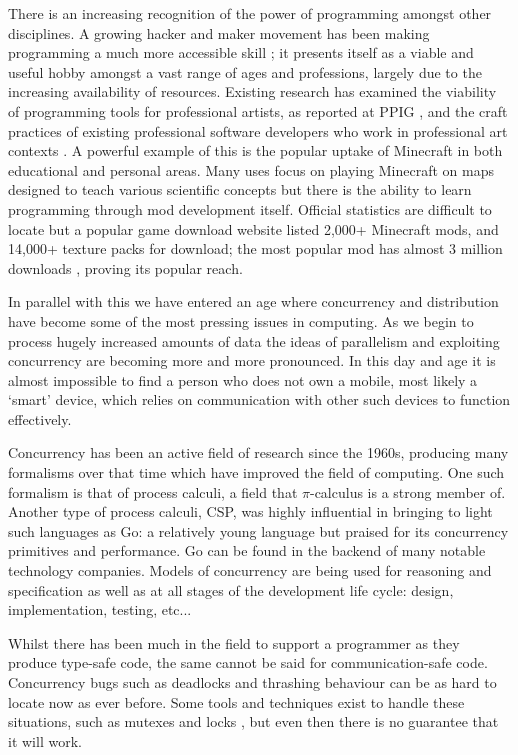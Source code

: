 \documentclass[11pt, abstracton, twoside, titlepage=true]{scrartcl}
\begin{document}
There is an increasing recognition of the power of programming amongst other 
disciplines. A growing hacker and maker movement has been making programming a 
much more accessible skill \cite{BAD14}; it presents itself as a viable and 
useful hobby amongst a vast range of ages and professions, largely due to the 
increasing availability of resources. Existing research has examined the 
viability of programming tools for professional artists, as reported at PPIG 
\cite{Ch12,BC05}, and the craft practices of existing professional software
developers who work in professional art contexts \cite{W10}. A powerful example 
of this is the popular uptake of Minecraft in both educational and personal areas. 
Many uses focus on playing Minecraft on maps designed to teach various scientific 
concepts \cite{mine1,mine2} but there is the ability to learn programming through 
mod development itself. Official statistics are difficult to locate but a popular 
game download website listed 2,000+ Minecraft mods, and 14,000+ texture packs for 
download; the most popular mod has almost 3 million downloads \cite{crush}, proving 
its popular reach. 

In parallel with this we have entered an age where concurrency and 
distribution have become some of the most pressing issues in computing. As we 
begin to process hugely increased amounts of data the ideas of parallelism and 
exploiting concurrency are becoming more and more pronounced. In this day and age
it is almost impossible to find a person who does not own a mobile, most likely a 
`smart' device, which relies on communication with other such devices to function 
effectively. 

Concurrency has been an active field of research since the 1960s, producing
many formalisms over that time which have improved the field of computing. One 
such formalism is that of process calculi, a field that $\pi$-calculus is a strong
member of. Another type of process calculi, CSP, was highly influential in 
bringing to light such languages as Go: a relatively young language but praised
for its concurrency primitives and performance. Go can be found in the backend
of many notable technology companies. Models of concurrency are being used for
reasoning and specification as well as at all stages of the development life
cycle: design, implementation, testing, etc...

Whilst there has been much in the field to support a programmer as they produce
type-safe code, the same cannot be said for communication-safe code. Concurrency
bugs such as deadlocks and thrashing behaviour can be as hard to locate now as
ever before. Some tools and techniques exist to handle these situations, such as
mutexes and locks \cite{T95}, but even then there is no guarantee
that it will work. 
\end{document}
